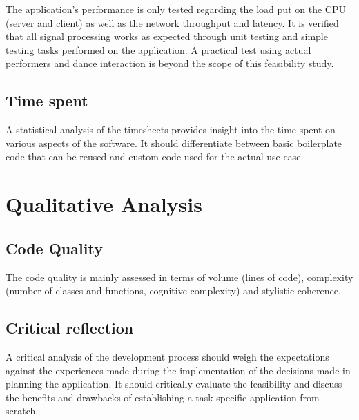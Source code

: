 The application's performance is only tested regarding the load put on the \ac{CPU} (server and client) as well as the network throughput and latency. It is verified that all signal processing works as expected through unit testing and simple testing tasks performed on the application. A practical test using actual performers and dance interaction is beyond the scope of this feasibility study.

\subsection{Time spent}

A statistical analysis of the timesheets provides insight into the time spent on various aspects of the software. It should differentiate between basic boilerplate code that can be reused and custom code used for the actual use case.

\section{Qualitative Analysis}

\subsection{Code Quality}

The code quality is mainly assessed in terms of volume (lines of code), complexity (number of classes and functions, cognitive complexity) and stylistic coherence.

\subsection{Critical reflection}

A critical analysis of the development process should weigh the expectations against the experiences made during the implementation of the decisions made in planning the application. It should critically evaluate the feasibility and discuss the benefits and drawbacks of establishing a task-specific application from scratch.

